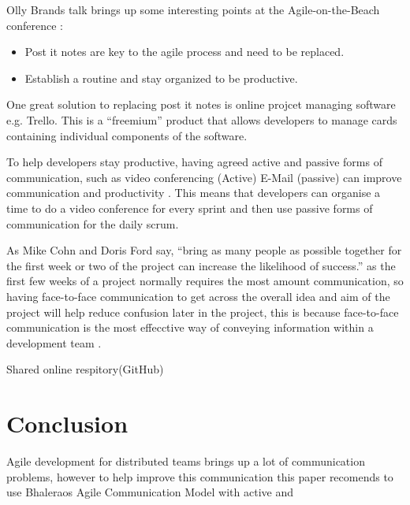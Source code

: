 \documentclass{scrartcl}
\begin{document}
Olly Brands talk brings up some interesting points at the Agile-on-the-Beach conference \cite{OllyBrandLiveBlog2015}:

\begin{itemize}
\item Post it notes are key to the agile process and need to be replaced. 
\item Establish a routine and stay organized to be productive. 
\end{itemize}

One great solution to replacing post it notes is online projcet managing software e.g. Trello. This is a ``freemium'' product that allows developers to manage cards containing individual components of the software.

To help developers stay productive, having agreed active and passive forms of communication, such as video conferencing (Active) E-Mail (passive) can improve communication and productivity \cite{joshi2013}. This means that developers can organise a time to do a video conference for every sprint and then use passive forms of communication for the daily scrum.

As Mike Cohn and Doris Ford say, ``bring as many people as possible together for the first week or two of the project can increase the likelihood of success.'' \cite{cohn2003} as the first few weeks of a project normally requires the most amount communication, so having face-to-face communication to get across the overall idea and aim of the project will help reduce confusion later in the project, this is because face-to-face communication is the most effecctive way of conveying information within a development team \cite{williams2012}.

Shared online respitory(GitHub)



\section{Conclusion}

Agile development for distributed teams brings up a lot of communication problems, however to help improve this communication this paper recomends to use Bhaleraos Agile Communication Model \cite{bhalerao2010} with active and 




\end{document}
